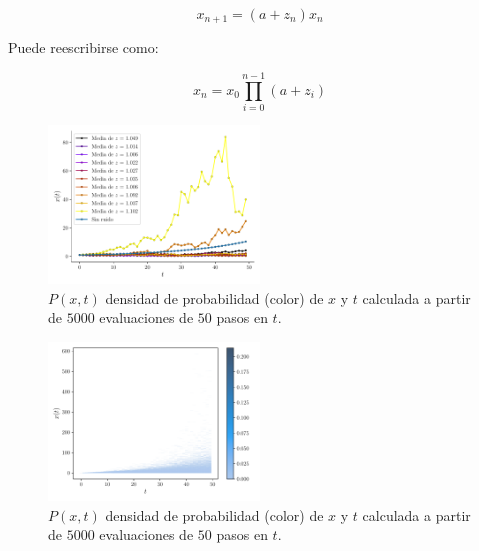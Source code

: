 \documentclass[twocolumn,aps,prl]{revtex4-1}
\newcommand{\nSimulacionesB}{5000}
\newcommand{\Nsteps}{50}
\begin{document}
\begin{equation}\label{ec:map02}
  x_{n+1} = (a + z_n) x_n
\end{equation}

Puede reescribirse como:

\begin{equation}\label{ec:map02-r}
  x_n = x_0 \prod_{i=0}^{n-1} (a + z_i)
\end{equation}

\begin{figure}[!ht]  
  \centering  
  \includegraphics[width=0.5\textwidth]{figuras/ex02-mapeo-02.pdf}
  \caption{$P(x,t)$ densidad de probabilidad (color) de $x$ y $t$ calculada a partir de $\nSimulacionesB$ evaluaciones de $\Nsteps$ pasos en $t$.}
  \label{fig:ultima_iteracion}
\end{figure}

\begin{figure}[!ht]  
  \centering  
  \includegraphics[width=0.5\textwidth]{figuras/ex02-histograma-02.pdf}
  \caption{$P(x,t)$ densidad de probabilidad (color) de $x$ y $t$ calculada a partir de $\nSimulacionesB$ evaluaciones de $\Nsteps$ pasos en $t$.}
  \label{fig:ultima_iteracion}
\end{figure}


\end{document}
